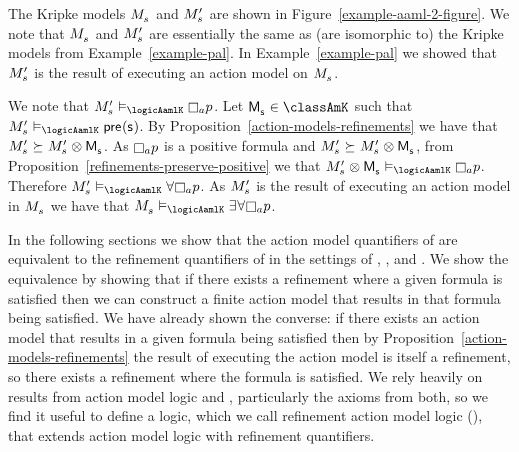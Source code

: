\begin{example}
\begin{figure}
\end{figure}

The Kripke models $\kPModel{\kStateS}$ and $\kPModelP{\kStateS}$ are shown in Figure~\ref{example-aaml-2-figure}.
We note that $\kPModel{\kStateS}$ and $\kPModelP{\kStateS}$ are essentially the same as (are isomorphic to) the Kripke models from Example~\ref{example-pal}.
In Example~\ref{example-pal} we showed that $\kPModelP{\kStateS}$ is the result of executing an action model on $\kPModel{\kStateS}$.

We note that $\kPModelP{\kStateS} \entails_\logicAamlK \knowsA \atomP$.
Let $\aPModel{\aStateS} \in \classAmK$ such that $\kPModelP{\kStateS} \entails_\logicAamlK \aPrecondition(\aStateS)$.
By Proposition~\ref{action-models-refinements} we have that $\kPModelP{\kStateS} \simulates \kPModelP{\kStateS} \exec \aPModel{\aStateS}$.
As $\knowsA \atomP$ is a positive formula and $\kPModelP{\kStateS} \simulates \kPModelP{\kStateS} \exec \aPModel{\aStateS}$, from Proposition~\ref{refinements-preserve-positive} we that $\kPModelP{\kStateS} \exec \aPModel{\aStateS} \entails_\logicAamlK \knowsA \atomP$.
Therefore $\kPModelP{\kStateS} \entails_\logicAamlK \allacts \knowsA \atomP$.
As $\kPModelP{\kStateS}$ is the result of executing an action model in $\kPModel{\kStateS}$ we have that $\kPModel{\kStateS} \entails_\logicAamlK \someacts \allacts \knowsA \atomP$.
\end{example}

\pagebreak

In the following sections we show that the action model quantifiers of \logicAaml{} are equivalent to the refinement quantifiers of \logicRml{} in the settings of \classK{}, \classKFF{}, and \classS{}.
We show the equivalence by showing that if there exists a refinement where a given formula is satisfied then we can construct a finite action model that results in that formula being satisfied.
We have already shown the converse: if there exists an action model that results in a given formula being satisfied then by Proposition~\ref{action-models-refinements} the result of executing the action model is itself a refinement, so there exists a refinement where the formula is satisfied.
We rely heavily on results from action model logic and \logicRml{}, particularly the axioms from both, so we find it useful to define a logic, which we call refinement action model logic (\logicRaml{}), that extends action model logic with refinement quantifiers.

